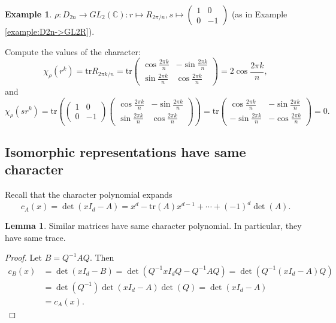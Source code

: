 \documentclass{article}
\newcommand{\tr}{\text{tr}}
\newcommand{\C}{\mathbb{C}}
\theoremstyle{definition}
\newtheorem{lemma}[defn]{Lemma}
\newtheorem{example}[defn]{Example}
\begin{document}
\begin{example}
$\rho:D_{2n}\rightarrow GL_2(\C):r\mapsto R_{2\pi/n}, s\mapsto \begin{pmatrix}1&0\\0&-1\end{pmatrix}$ (as in Example \ref{example:D2n->GL2R}).

Compute the values of the character:
\[
\chi_\rho(r^k)=\tr R_{2\pi k/n}=\tr \begin{pmatrix}
\cos \frac{2\pi k}{n} & -\sin \frac{2\pi k}{n} \\ \sin \frac{2\pi k}{n} & \cos \frac{2\pi k}{n}
\end{pmatrix}=2 \cos \frac{2\pi k}{n},
\]
and
\[
\chi_\rho(sr^k)=\tr\left( \begin{pmatrix}1&0\\0&-1\end{pmatrix}\begin{pmatrix}
\cos \frac{2\pi k}{n} & -\sin \frac{2\pi k}{n} \\ \sin \frac{2\pi k}{n} & \cos \frac{2\pi k}{n}
\end{pmatrix} \right)=\tr\begin{pmatrix}
\cos \frac{2\pi k}{n} & -\sin \frac{2\pi k}{n} \\ -\sin \frac{2\pi k}{n} & -\cos \frac{2\pi k}{n}
\end{pmatrix}=0.
\]
\end{example}

\subsection{Isomorphic representations have same character}
Recall that the character polynomial expands
\[
c_A(x)=\det (xI_d-A)=x^d-\tr(A)x^{d-1}+\cdots+(-1)^d \det(A).
\]

\begin{lemma}
\label{lemma:simmatsharecharpol}
Similar matrices have same character polynomial. In particular, they have same trace.
\end{lemma}
\begin{proof}
Let $B=Q^{-1}AQ$. Then
\[
\begin{aligned}
c_B(x)&=\det(xI_d-B)=\det\left(Q^{-1}xI_dQ-Q^{-1}AQ\right)=\det\left(Q^{-1}(xI_d-A)Q\right)\\
&=\det\left(Q^{-1}\right)\det(xI_d-A)\det(Q)=\det(xI_d-A)\\
&=c_A(x).
\end{aligned}
\]
\end{proof}
\end{document}
